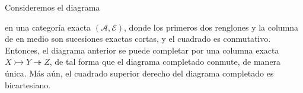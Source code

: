 \documentclass[tesis]{subfiles}
\begin{document}
%
%
%
%

\begin{Lema}\label{Bühler-3.5}
    Consideremos el diagrama
    \begin{center}
    \end{center}
    en una categoría exacta $(\mathscr{A},\mathscr{E})$, donde los primeros dos renglones y la columna de en medio son sucesiones exactas cortas, y el cuadrado es conmutativo. Entonces, el diagrama anterior se puede completar por una columna exacta $X\rightarrowtail Y\twoheadrightarrow Z$, de tal forma que el diagrama completado conmute, de manera única. Más aún, el cuadrado superior derecho del diagrama completado es bicartesiano.
\end{Lema}
\end{document}
